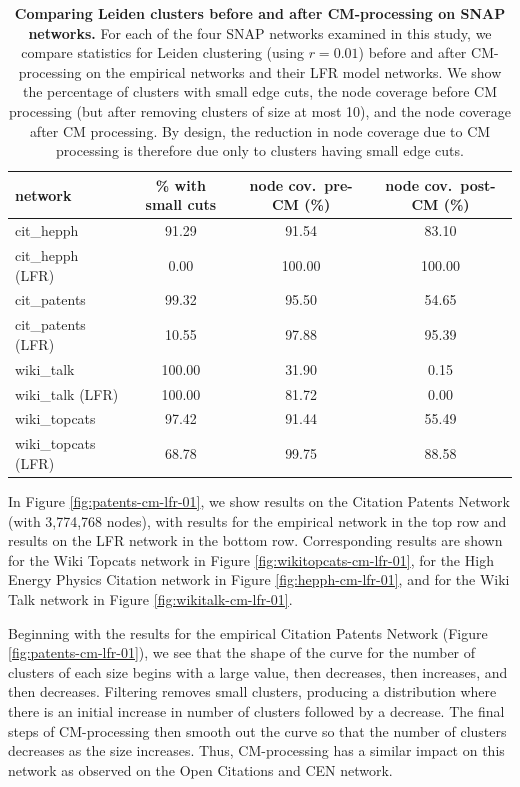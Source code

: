 \documentclass[11pt]{article}   	%
\begin{document}
\begin{table}[ht]
\centering
\begin{tabular}{lccc}
  \hline
 network & \% with small cuts & node cov.~pre-CM (\%) & node cov.~post-CM (\%) \\
  \hline
  cit\_hepph  & 91.29 & 91.54 & 83.10 \\
  cit\_hepph (LFR) & 0.00 & 100.00 & 100.00 \\
  \hline
  cit\_patents & 99.32 & 95.50 & 54.65\\
    cit\_patents  (LFR) & 10.55 & 97.88 & 95.39\\
  \hline
  wiki\_talk & 100.00 & 31.90 & 0.15\\
    wiki\_talk (LFR) & 100.00 & 81.72 & 0.00\\
  \hline
  wiki\_topcats & 97.42 & 91.44 & 55.49 \\
   wiki\_topcats  (LFR)& 68.78 & 99.75 & 88.58 \\
   \hline
\end{tabular}
\caption{\textbf{Comparing Leiden clusters before and after CM-processing  on SNAP networks.} For each of the four SNAP networks
examined in this study, we compare statistics for Leiden clustering (using $r=0.01$) before and after CM-processing on the empirical networks and their LFR model
networks. We show the percentage of clusters with small edge cuts, the node coverage before CM processing (but after removing clusters of size at most 10), and the node coverage
after CM processing.  By design, the reduction in node coverage due to CM processing  is therefore due only to clusters having small edge cuts.}
\label{tab:LFR-vs-empirical-SNAP}
\end{table}



In Figure \ref{fig:patents-cm-lfr-01}, we show results on the Citation Patents Network  (with 3,774,768 nodes), with results for the
empirical  network in the top row and results on the LFR network in the bottom row.
Corresponding results are shown for the Wiki Topcats network in Figure \ref{fig:wikitopcats-cm-lfr-01}, for the High Energy Physics Citation network
in Figure \ref{fig:hepph-cm-lfr-01}, and for the Wiki Talk network in Figure  \ref{fig:wikitalk-cm-lfr-01}.



Beginning with the results for the empirical Citation Patents Network (Figure \ref{fig:patents-cm-lfr-01}), we see that the shape of the curve for the number of clusters of each size begins with a large value, then decreases, then increases, and then decreases.  
Filtering removes small clusters, producing a distribution where there is an initial increase in number of clusters
followed by a decrease.  The final  steps of CM-processing then smooth out the curve so that the number of clusters decreases as the size increases.
Thus, CM-processing has a similar impact on this network as observed on the Open Citations and CEN network.
\end{document}
